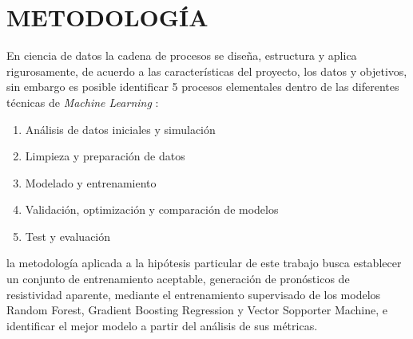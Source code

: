 \chapter{METODOLOGÍA}




	En ciencia de datos la cadena de procesos se diseña, estructura y aplica rigurosamente, de acuerdo a las características del proyecto, los datos y objetivos, sin embargo es posible identificar 5 procesos elementales dentro de las diferentes técnicas de \textit{Machine Learning} :%
	
	\begin{enumerate}
		\item Análisis de datos iniciales y simulación
		\item Limpieza y preparación de datos
		\item Modelado y entrenamiento
		\item Validación, optimización y comparación de modelos
		\item Test y evaluación
	\end{enumerate}
	
	la metodología aplicada a la hipótesis particular de este trabajo busca establecer un conjunto de entrenamiento aceptable, generación de pronósticos de resistividad aparente, mediante el entrenamiento supervisado de los modelos Random Forest, Gradient Boosting Regression y Vector Sopporter Machine, e identificar el mejor modelo a partir del análisis de sus métricas.
	
